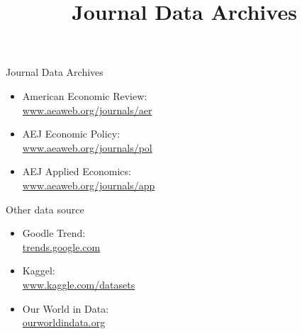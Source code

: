 \documentclass[hyperref={pdfpagelabels=false}]{beamer}
\begin{document}
\title[]  
{Journal Data Archives}


\author 
{}

\institute{}






\date
{}


\begin{frame}{}
	\titlepage
\end{frame}






\begin{frame}{Journal Data Archives}
\begin{itemize} 
\item American Economic Review: \\ \href{https://www.aeaweb.org/journals/aer/issues}{www.aeaweb.org/journals/aer}
\vspace{0.2cm}
\item AEJ Economic Policy: \\ \href{https://www.aeaweb.org/journals/pol/issues}{www.aeaweb.org/journals/pol}
\vspace{0.2cm}
\item AEJ Applied Economics: \\ \href{https://www.aeaweb.org/journals/app/issues}{www.aeaweb.org/journals/app}
\vspace{0.2cm}

\end{itemize}
\end{frame}



\begin{frame}{Other data source}
\begin{itemize}
\item Goodle Trend: \\ \href{https://trends.google.com/trends/}{trends.google.com}
\vspace{0.2cm}
\item Kaggel: \\ \href{https://www.kaggle.com/datasets}{www.kaggle.com/datasets}
\vspace{0.2cm}
\item Our World in Data: \\ \href{https://ourworldindata.org/}{ourworldindata.org}




\end{itemize}
\end{frame}
\end{document}

